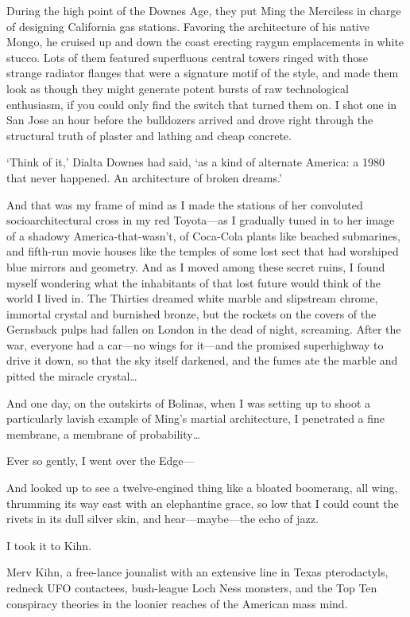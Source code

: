 During the high point of the Downes Age, they put Ming the Merciless in charge of designing California gas stations. Favoring the architecture of his native Mongo, he cruised up and down the coast erecting raygun emplacements in white stucco. Lots of them featured superfluous central towers ringed with those strange radiator flanges that were a signature motif of the style, and made them look as though they might generate potent bursts of raw technological enthusiasm, if you could only find the switch that turned them on. I shot one in San Jose an hour before the bulldozers arrived and drove right through the structural truth of plaster and lathing and cheap concrete.

`Think of it,' Dialta Downes had said, `as a kind of alternate America: a 1980 that never happened. An architecture of broken dreams.'

And that was my frame of mind as I made the stations of her convoluted socioarchitectural cross in my red Toyota---as I gradually tuned in to her image of a shadowy America-that-wasn't, of Coca-Cola plants like beached submarines, and fifth-run movie houses like the temples of some lost sect that had worshiped blue mirrors and geometry. And as I moved among these secret ruins, I found myself wondering what the inhabitants of that lost future would think of the world I lived in. The Thirties dreamed white marble and slipstream chrome, immortal crystal and burnished bronze, but the rockets on the covers of the Gernsback pulps had fallen on London in the dead of night, screaming. After the war, everyone had a car---no wings for it---and the promised superhighway to drive it down, so that the sky itself darkened, and the fumes ate the marble and pitted the miracle crystal\ldots

And one day, on the outskirts of Bolinas, when I was setting up to shoot a particularly lavish example of Ming's martial architecture, I penetrated a fine membrane, a membrane of probability\ldots

Ever so gently, I went over the Edge---

And looked up to see a twelve-engined thing like a bloated boomerang, all wing, thrumming its way east with an elephantine grace, so low that I could count the rivets in its dull silver skin, and hear---maybe---the echo of jazz.

I took it to Kihn.

Merv Kihn, a free-lance jounalist with an extensive line in Texas pterodactyls, redneck UFO contactees, bush-league Loch Ness monsters, and the Top Ten conspiracy theories in the loonier reaches of the American mass mind.

